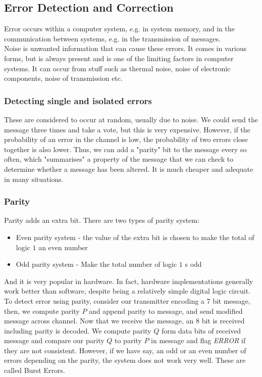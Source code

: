 \documentclass[a4paper]{article}
\theoremstyle{plain}
\theoremstyle{definition}
\theoremstyle{remark}
\begin{document}
\subsection{Error Detection and Correction}
Error occurs within a computer system, e.g. in system memory, and in the communication between systems, e.g. in the transmission of messages. \\
Noise is unwanted information that can cause these errors. It comes in various forms, but is always present and is one of the limiting factors in computer systems. It can occur from stuff such as thermal noise, noise of electronic components, noise of transmission etc.
\subsubsection{Detecting single and isolated errors}
These are considered to occur at random, usually due to noise. We could send the message three times and take a vote, but this is very expensive. However, if the probability of an error in the channel is low, the probability of two errors close together is also lower. Thus, we can add a "parity" bit to the message every so often, which "summarises" a property of the message that we can check to determine whether a message has been altered. It is much cheaper and adequate in many situations.
\subsubsection{Parity}
Parity adds an extra bit. There are two types of parity system:
\begin{itemize}
	\item Even parity system - the value of the extra bit is chosen to make the total of logic $1$ an even number
	\item Odd parity system - Make the total number of logic $1$ s odd
\end{itemize}
And it is very popular in hardware. In fact, hardware implementations generally work better than software, despite being a relatively simple digital logic circuit. \\

To detect error using parity, consider our transmitter encoding a $7$ bit message, then, we compute parity $P$ and append parity to message, and send modified message across channel. Now that we receive the message, an $8$ bit is received including parity is decoded. We compute parity $Q$ form data bits of received message and compare our parity $Q$ to parity $P$ in message and flag \textit{ERROR} if they are not consistent. However, if we have say, an odd or an even number of errors depending on the parity, the system does not work very well. These are called Burst Errors. 
\end{document}
